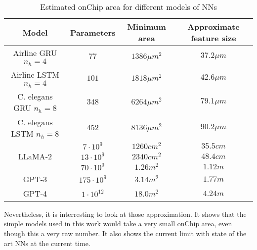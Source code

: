 \begin{table}[H]
  \centering
  \begin{tabular}{|c|c|c|c|}
    \hline
    \rowcolor{gray}
    Model & Parameters & Minimum area & Approximate feature size \\
    \hline
    Airline \ac{GRU} $n_h=4$ & $77$ & $1386\mu m^2$ & $37.2\mu m$\\
    \hline
    Airline \ac{LSTM} $n_h=4$ & $101$ & $1818\mu m^2$ & $42.6\mu m$\\
    \hline
    \ac{C. elegans} \ac{GRU} $n_h=8$ & $348$ & $6264\mu m^2$ & $79.1\mu m$\\
    \hline
    \ac{C. elegans} \ac{LSTM} $n_h=8$ & $452$ & $8136\mu m^2$ & $90.2\mu m$\\
    \hline
    \multirow{3}{*}{\acs{LLaMA}-2} & $7\cdot 10^9$ & $1260 cm^2$ & $35.5 cm$ \\
    \cline{2-4}
    & $13\cdot 10^9$ & $2340 cm^2$ & $48.4 cm$ \\
    \cline{2-4}
    & $70\cdot 10^9$ & $1.26 m^2$ & $1.12 m$ \\
    \hline
    \acs{GPT}-3 & $175\cdot 10^9$ & $3.14 m^2$ & $1.77m$\\
    \hline
    \acs{GPT}-4 & $1\cdot 10^{12}$ & $18.0 m^2$ & $4.24m$\\
    \hline
  \end{tabular}
  \caption{Estimated onChip area for different models of \acp{NN}}
  \label{tab:areas}
\end{table}

Nevertheless, it is interresting to look at those approximation. It shows that the simple models used in this work would take a very small onChip area, even though this a very raw number. It also shows the current limit with state of the art \acp{NN} at the current time.
